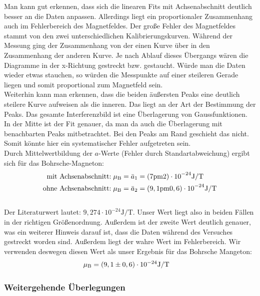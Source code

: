Man kann gut erkennen, dass sich die linearen Fits mit Achsenabschnitt deutlich besser an die Daten anpassen. Allerdings liegt ein proportionaler Zusammenhang auch im Fehlerbereich des Magnetfeldes. Der große Fehler des Magnetfeldes stammt von den zwei unterschiedlichen Kalibrierungskurven. Während der Messung ging der Zusammenhang von der einen Kurve über in den Zusammenhang der anderen Kurve. Je nach Ablauf dieses Übergangs wären die Diagramme in der x-Richtung gestreckt bzw. gestaucht. Würde man die Daten wieder etwas stauchen, so würden die Messpunkte auf einer steileren Gerade liegen und somit proportional zum Magnetfeld sein.\\
Weiterhin kann man erkennen, dass die beiden äußersten Peaks eine deutlich steilere Kurve aufweisen als die inneren. Das liegt an der Art der Bestimmung der Peaks. Das gesamte Interferenzbild ist eine Überlagerung von Gaussfunktionen. In der Mitte ist der Fit genauer, da man da auch die Überlagerung mit benachbarten Peaks mitbetrachtet. Bei den Peaks am Rand geschieht das nicht. Somit könnte hier ein systematischer Fehler aufgetreten sein.\\
 
Durch Mittelwertbildung der $a$-Werte (Fehler durch Standartabweichung) ergibt sich für das Bohrsche-Magneton:\\
\begin{align*}
\text{mit Achsenabschnitt:}\;& \mu\ind{B} = \bar{a}_1 = \si{(7 \pm 2) \cdot 10^{-24} \joule/\tesla}\\
\text{ohne Achsenabschnitt:}\;& \mu\ind{B} = \bar{a}_2 = \si{(9,1 \pm 0,6) \cdot 10^{-24} \joule/\tesla}\\
\end{align*}\\
Der Literaturwert lautet: $9,274 \cdot 10^{-24} \si{\joule/\tesla}$\cite{wiki_konst}. Unser Wert liegt also in beiden Fällen in der richtigen Größenordnung. Außerdem ist der zweite Wert deutlich genauer, was ein weiterer Hinweis darauf ist, dass die Daten während des Versuches gestreckt worden sind. Außerdem liegt der wahre Wert im Fehlerbereich. Wir verwenden deswegen diesen Wert als unser Ergebnis für das Bohrsche Mangeton:
\begin{align*}
\mu\ind{B} &= (9,1 \pm 0,6) \cdot 10^{-24} \si{\joule/\tesla}
\end{align*}

\subsubsection{Weitergehende Überlegungen}
